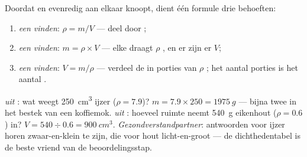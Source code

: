 \begin{proposition}\label{prop:g7:volume-mass-density:recipes}
Doordat   en  evenredig aan elkaar knoopt,
dient één formule drie behoeften:
\begin{enumerate}
  \item \emph{een  vinden}: $\rho = m/V$ --- deel
         door ;
  \item \emph{een  vinden}: $m = \rho \times V$ --- elke
         draagt $\rho$ , en er zijn er $V$;
  \item \emph{een  vinden}: $V = m/\rho$ --- verdeel de
         in porties van $\rho$ ; het aantal porties is
        het aantal .
\end{enumerate}
\end{proposition}

\begin{example}\label{ex:g7:volume-mass-density:atwork}
\emph{ uit }: wat weegt \qty{250}{cm^3} ijzer
($\rho = 7.9$)? $m = 7.9 \times 250 = \qty{1975}{g}$ --- bijna twee
 in het bestek van een koffiemok.
\emph{ uit }: hoeveel ruimte neemt \qty{540}{g}
eikenhout ($\rho = 0.6$) in? $V = 540 \div 0.6 = \qty{900}{cm^3}$.
\emph{Gezondverstandpartner}: antwoorden voor ijzer horen
zwaar-en-klein te zijn, die voor hout licht-en-groot --- de
dichthedentabel is de beste vriend van de beoordelingsstap.
\end{example}

